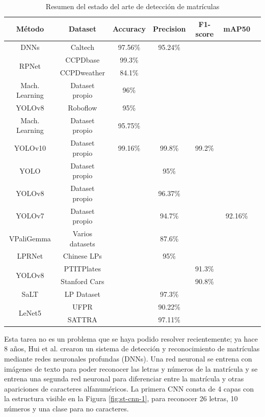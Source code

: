 \documentclass[12pt,a4paper,onecolumn,oneside]{report}
\begin{document}
\begin{table}[ht]
    \centering
    \begin{tabular}{|c|c|c|c|c|c|c|}
    \hline
        \textbf{Método} & \textbf{Dataset} & \textbf{Accuracy} & \textbf{Precision} & \textbf{F1-score} & \textbf{mAP50}\\
        \hline
        DNNs & Caltech & 97.56\% & 95.24\% & \- & \-\\
        \hline
        \multirow{2}{*}{RPNet} & CCPDbase & 99.3\% & \- & \- & \-\\
        & CCPDweather & 84.1\% & \- & \- & \-\\
        \hline
        Mach. Learning & Dataset propio & 96\% & \- & \- & \-\\
        \hline
        YOLOv8 & Roboflow & 95\% & \- & \- & \-\\
        \hline
        Mach. Learning & Dataset propio & 95.75\% & \- & \- & \-\\
        \hline
        YOLOv10 & Dataset propio & 99.16\% & 99.8\% & 99.2\% & \-\\
        \hline
        YOLO & Dataset propio & \- & 95\% & \- & \-\\
        \hline
        YOLOv8 & Dataset propio & \- & 96.37\% & \- & \-\\
        \hline
        YOLOv7 & Dataset propio & \- & 94.7\% & \- & 92.16\%\\
        \hline
        VPaliGemma & Varios datasets & \- & 87.6\% & \- & \-\\
        \hline
        LPRNet & Chinese LPs & \- & 95\% & \- & \-\\
        \hline
        \multirow{2}{*}{YOLOv8} & PTITPlates & \- & \- & 91.3\% & \-\\
        & Stanford Cars & \- & \- & 90.8\% & \-\\
        \hline
        SaLT & LP Dataset & \- & 97.3\% & \- & \-\\
        \hline
        \multirow{2}{*}{LeNet5} & UFPR & \- & 90.22\% & \- & \-\\
        & SATTRA & \- & 97.11\% & \- & \-\\
        \hline
    \end{tabular}
    \caption{Resumen del estado del arte de detección de matrículas}
    \label{tab:resumen-arte-lp}
\end{table}

Esta tarea no es un problema que se haya podido resolver recientemente; ya hace 8 años, Hui et al. \cite{LI201814} crearon un sistema de detección y reconocimiento de matrículas mediante redes neuronales profundas (DNNs). Una red neuronal se entrena con imágenes de texto para poder reconocer las letras y números de la matrícula y se entrena una segunda red neuronal para diferenciar entre la matrícula y otras apariciones de caracteres alfanuméricos. La primera CNN consta de 4 capas con la estructura visible en la Figura \ref{fig:st-cnn-1}, para reconocer 26 letras, 10 números y una clase para no caracteres.
\end{document}

